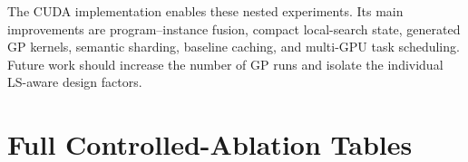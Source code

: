 \documentclass[letterpaper,journal]{IEEEtran}
\begin{document}
The CUDA implementation enables these nested experiments.
Its main improvements are program--instance fusion, compact local-search
state, generated GP kernels, semantic sharding, baseline caching, and
multi-GPU task scheduling.
Future work should increase the number of GP runs and isolate the individual
LS-aware design factors.

\appendices

\section{Full Controlled-Ablation Tables}

\begin{table}[h]
\caption{Residual transition minus matched replacement (pp)}
\label{tab:appendix-residual}
\centering
\scriptsize
{}
\end{table}

\begin{table}[h]
\caption{Two-tree minus one-tree controls at 31 nodes (pp)}
\label{tab:appendix-architecture}
\centering
\scriptsize
{}
\end{table}

\begin{table}[h]
\caption{Core/Full and F0/F1 factorial effects (pp)}
\label{tab:appendix-factorial}
\centering
\scriptsize
{}
\end{table}

\begin{table}[h]
\caption{Tree deletion and cross-run pairing interventions (pp)}
\label{tab:appendix-mechanism}
\centering
\scriptsize
{}
\end{table}
\end{document}
